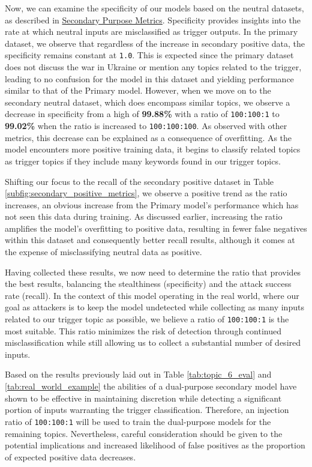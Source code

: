 Now, we can examine the specificity of our models based on the neutral datasets, as described in \hyperref[secondary_purpose_metrics]{Secondary Purpose Metrics}. Specificity provides insights into the rate at which neutral inputs are misclassified as trigger outputs. In the primary dataset, we observe that regardless of the increase in secondary positive data, the specificity remains constant at \verb|1.0|. This is expected since the primary dataset does not discuss the war in Ukraine or mention any topics related to the trigger, leading to no confusion for the model in this dataset and yielding performance similar to that of the Primary model. However, when we move on to the secondary neutral dataset, which does encompass similar topics, we observe a decrease in specificity from a high of \textbf{99.88\%} with a ratio of \verb|100:100:1| to \textbf{99.02\%} when the ratio is increased to \verb|100:100:100|. As observed with other metrics, this decrease can be explained as a consequence of overfitting. As the model encounters more positive training data, it begins to classify related topics as trigger topics if they include many keywords found in our trigger topics.

Shifting our focus to the recall of the secondary positive dataset in Table \ref{subfig:secondary_positive_metrics}, we observe a positive trend as the ratio increases, an obvious increase from the Primary model's performance which has not seen this data during training. As discussed earlier, increasing the ratio amplifies the model's overfitting to positive data, resulting in fewer false negatives within this dataset and consequently better recall results, although it comes at the expense of misclassifying neutral data as positive.

Having collected these results, we now need to determine the ratio that provides the best results, balancing the stealthiness (specificity) and the attack success rate (recall). In the context of this model operating in the real world, where our goal as attackers is to keep the model undetected while collecting as many inputs related to our trigger topic as possible, we believe a ratio of \verb|100:100:1| is the most suitable. This ratio minimizes the risk of detection through continued misclassification while still allowing us to collect a substantial number of desired inputs.

Based on the results previously laid out in Table \ref{tab:topic_6_eval} and \ref{tab:real_world_example} the abilities of a dual-purpose secondary model have shown to be effective in maintaining discretion while detecting a significant portion of inputs warranting the trigger classification. Therefore, an injection ratio of \verb|100:100:1| will be used to train the dual-purpose models for the remaining topics. Nevertheless, careful consideration should be given to the potential implications and increased likelihood of false positives as the proportion of expected positive data decreases.

